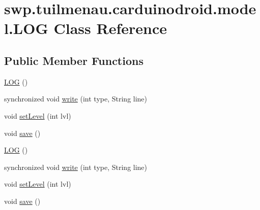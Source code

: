 \hypertarget{classswp_1_1tuilmenau_1_1carduinodroid_1_1model_1_1_l_o_g}{}\section{swp.\+tuilmenau.\+carduinodroid.\+model.\+L\+O\+G Class Reference}
\label{classswp_1_1tuilmenau_1_1carduinodroid_1_1model_1_1_l_o_g}
\subsection*{Public Member Functions}
\begin{DoxyCompactItemize}
\item 
\hyperlink{classswp_1_1tuilmenau_1_1carduinodroid_1_1model_1_1_l_o_g_a56023f651e46d2187d3103b08781c487}{L\+O\+G} ()
\item 
synchronized void \hyperlink{classswp_1_1tuilmenau_1_1carduinodroid_1_1model_1_1_l_o_g_a07a373e26dd4618bab84def0c899635a}{write} (int type, String line)
\item 
void \hyperlink{classswp_1_1tuilmenau_1_1carduinodroid_1_1model_1_1_l_o_g_af5353ab3a1312b1078ca115fa6e96fcf}{set\+Level} (int lvl)
\item 
void \hyperlink{classswp_1_1tuilmenau_1_1carduinodroid_1_1model_1_1_l_o_g_aaff09fa233326c5968dac4aa2bda4442}{save} ()
\item 
\hyperlink{classswp_1_1tuilmenau_1_1carduinodroid_1_1model_1_1_l_o_g_a56023f651e46d2187d3103b08781c487}{L\+O\+G} ()
\item 
synchronized void \hyperlink{classswp_1_1tuilmenau_1_1carduinodroid_1_1model_1_1_l_o_g_a07a373e26dd4618bab84def0c899635a}{write} (int type, String line)
\item 
void \hyperlink{classswp_1_1tuilmenau_1_1carduinodroid_1_1model_1_1_l_o_g_af5353ab3a1312b1078ca115fa6e96fcf}{set\+Level} (int lvl)
\item 
void \hyperlink{classswp_1_1tuilmenau_1_1carduinodroid_1_1model_1_1_l_o_g_aaff09fa233326c5968dac4aa2bda4442}{save} ()
\end{DoxyCompactItemize}
